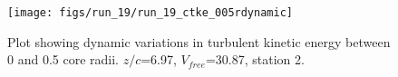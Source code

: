 \begin{figure}[H]
\centering
\texttt{[image: figs/run\_19/run\_19\_ctke\_005rdynamic]}
\caption{Plot showing dynamic variations in turbulent kinetic energy between 0 and 0.5 core radii. $z/c$=6.97, $V_{free}$=30.87, station 2.}
\label{fig:run_19_ctke_005rdynamic}
\end{figure}


